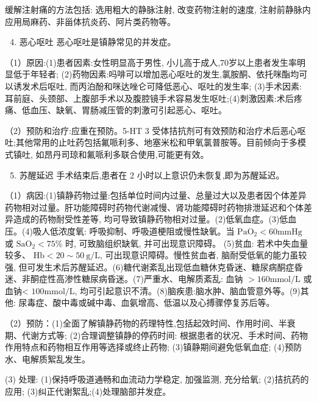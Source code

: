 \documentclass[10pt]{article}
\begin{document}
缓解注射痛的方法包括: 选用粗大的静脉注射, 改变药物注射的速度, 注射前静脉内应用局麻药、非甾体抗炎药、阿片类药物等。

\begin{enumerate}
  \setcounter{enumi}{3}
  \item 恶心呕吐 恶心呕吐是镇静常见的并发症。
\end{enumerate}

（1）原因:(1)患者因素:女性明显高于男性, 小儿高于成人,70岁以上患者发生率明显低于年轻者; (2)药物因素:吗啡可以增加恶心呕吐的发生,氯胺酮、依托咪酯均可以诱发术后呕吐, 而丙泊酚和咪达唑仑可降低恶心、呕吐的发生率; (3)手术因素: 耳前庭、头颈部、上腹部手术以及腹腔镜手术容易发生呕吐;(4)刺激因素:术后疼痛、低血压、缺氧、胃肠减压管的刺激可引起恶心、呕吐。

（2）预防和治疗:应重在预防。5-HT 3 受体拮抗剂可有效预防和治疗术后恶心呕吐;其他常用的止吐药包括氟哌利多、地塞米松和甲氧氯普胺等。目前倾向于多模式镇吐, 如昂丹司琼和氟哌利多联合使用,可能更有效。

\begin{enumerate}
  \setcounter{enumi}{4}
  \item 苏醒延迟 手术结束后,患者在 2 小时以上意识仍未恢复,即为苏醒延迟。
\end{enumerate}

（1）病因:(1)镇静药物过量:包括单位时间内过量、总量过大以及患者因个体差异药物相对过量。肝功能障碍时药物代谢减慢、肾功能障碍时药物排泄延迟和个体差异造成的药物耐受性差等, 均可导致镇静药物相对过量。(2)低氧血症。(3)低血压。(4)吸人低浓度氧: 呼吸抑制、呼吸道梗阻或慢性缺氧。当 $\mathrm{PaO}_{2}<60 \mathrm{mmHg}$ 或 $\mathrm{SaO}_{2}<75 \%$ 时, 可致脑组织缺氧, 并可出现意识障碍。 (5)贫血: 若术中失血量较多、 $\mathrm{Hb}<20 \sim 50 \mathrm{~g} / \mathrm{L}$, 可出现意识障碍。慢性贫血者, 脑耐受低氧的能力虽较强, 但可发生术后苏醒延迟。(6)糖代谢紊乱出现低血糖休克昏迷、糖尿病酮症昏迷、非酮症性高渗性糖尿病昏迷。(7)严重水、电解质紊乱: 血钠 $>160 \mathrm{mmol} / \mathrm{L}$ 或血钠< $100 \mathrm{mmol} / \mathrm{L}$, 均可引起意识不清。(8)脑疾患:脑水肿、脑血管意外等。(9)其他: 尿毒症、酸中毒或碱中毒、血氨增高、低温以及心搏骤停复苏后等。

（2）预防：(1)全面了解镇静药物的药理特性,包括起效时间、作用时间、半衰期、代谢方式等; (2)合理调整镇静的停药时间: 根据患者的状况、手术时间、药物作用特点和药物相互作用等选择或终止药物; (3)镇静期间避免低氧血症; (4)预防水、电解质絮乱发生。

(3) 处理: (1)保持呼吸道通畅和血流动力学稳定, 加强监测, 充分给氧; (2)拮抗药的应用; (3)纠正代谢絮乱;(4)处理脑部并发症。
\end{document}
